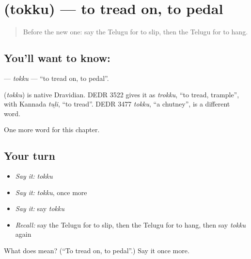 \section[\texorpdfstring{\te{తొక్కు} (tokku)}{తొక్కు (tokku)}]{ (tokku) — to tread on, to pedal}

\label{lesson:TE-C206-tokku}



\begin{quote}
Before the new one: say the Telugu for to slip, then the Telugu for to hang.
\end{quote}

\subsection*{You'll want to know: }
\textbf{} — \emph{tokku} — \textquotedblleft{}to tread on, to pedal\textquotedblright{}.

\begin{cousinweb}
\textbf{} (\emph{tokku}) is native Dravidian. DEDR 3522 gives it as \emph{trokku}, \textquotedblleft{}to tread, trample\textquotedblright{}, with Kannada \emph{tuḻi}, \textquotedblleft{}to tread\textquotedblright{}. DEDR 3477 \emph{tokku}, \textquotedblleft{}a chutney\textquotedblright{}, is a different word.
\end{cousinweb}

\begin{grammarlens}[title={What you've built}]
One more word for this chapter.
\end{grammarlens}

\subsection*{Your turn}
\begin{itemize}
\raggedright
  \item \emph{Say it:} \emph{tokku}
  \item \emph{Say it:} \emph{tokku}, once more
  \item \emph{Say it:} say \emph{tokku}
  \item \emph{Recall:} say the Telugu for to slip, then the Telugu for to hang, then say \emph{tokku} again
\end{itemize}

\begin{tcolorbox}[breakable,colback=teal!4,colframe=teal!35!black,title={Before you move on}]
What does  mean? (\textquotedblleft{}To tread on, to pedal\textquotedblright{}.) Say it once more.
\end{tcolorbox}
